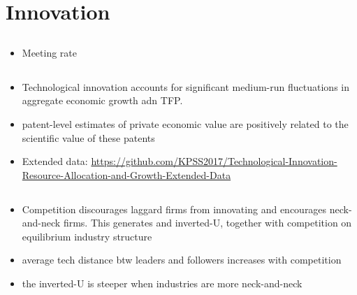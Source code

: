 \documentclass[10pt]{article} %
\begin{document}
\section{Innovation}
    \subsection{\cite{AghionHarrisHowittVickers2001}}
    
    \subsection{\cite{Prato2022}}
    \begin{itemize}
        \item Meeting rate
    \end{itemize}
    \subsection{\cite{BaiJinLu2023}}

    \subsection{\cite{AdaoBerajaPandalaiNayar2020}}

    \subsection{\cite{LiuMa2023}}

    \subsection{\cite{KoganPapanikolaouSeruStoffman2017}}
    \begin{itemize}
        \item Technological innovation accounts for significant medium-run fluctuations in aggregate economic growth adn TFP.
        \item patent-level estimates of private economic value are positively related to the scientific value of these patents
        \item Extended data: \url{https://github.com/KPSS2017/Technological-Innovation-Resource-Allocation-and-Growth-Extended-Data}
    \end{itemize}

    \subsection{\cite{AghionBloomBlundellGriffithHowitt2005}}
    \begin{itemize}
        \item Competition discourages laggard firms from innovating and encourages neck-and-neck firms. This generates and inverted-U, together with competition on equilibrium industry structure
        \item average tech distance  btw leaders and followers increases with competition
        \item the inverted-U is steeper when industries are more neck-and-neck
    \end{itemize}
\end{document}

